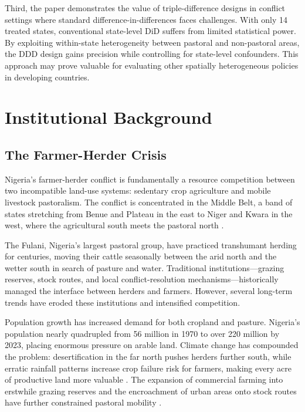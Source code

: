 \documentclass[12pt]{article}
\begin{document}
Third, the paper demonstrates the value of triple-difference designs in conflict settings where standard difference-in-differences faces challenges. With only 14 treated states, conventional state-level DiD suffers from limited statistical power. By exploiting within-state heterogeneity between pastoral and non-pastoral areas, the DDD design gains precision while controlling for state-level confounders. This approach may prove valuable for evaluating other spatially heterogeneous policies in developing countries.

\section{Institutional Background}

\subsection{The Farmer-Herder Crisis}

Nigeria's farmer-herder conflict is fundamentally a resource competition between two incompatible land-use systems: sedentary crop agriculture and mobile livestock pastoralism. The conflict is concentrated in the Middle Belt, a band of states stretching from Benue and Plateau in the east to Niger and Kwara in the west, where the agricultural south meets the pastoral north \citep{higazi2016farmer, akov2017trend}.

The Fulani, Nigeria's largest pastoral group, have practiced transhumant herding for centuries, moving their cattle seasonally between the arid north and the wetter south in search of pasture and water. Traditional institutions---grazing reserves, stock routes, and local conflict-resolution mechanisms---historically managed the interface between herders and farmers. However, several long-term trends have eroded these institutions and intensified competition.

Population growth has increased demand for both cropland and pasture. Nigeria's population nearly quadrupled from 56 million in 1970 to over 220 million by 2023, placing enormous pressure on arable land. Climate change has compounded the problem: desertification in the far north pushes herders further south, while erratic rainfall patterns increase crop failure risk for farmers, making every acre of productive land more valuable \citep{odoh2014climate, hsiang2013quantifying}. The expansion of commercial farming into erstwhile grazing reserves and the encroachment of urban areas onto stock routes have further constrained pastoral mobility \citep{abbass2012no}.
\end{document}
